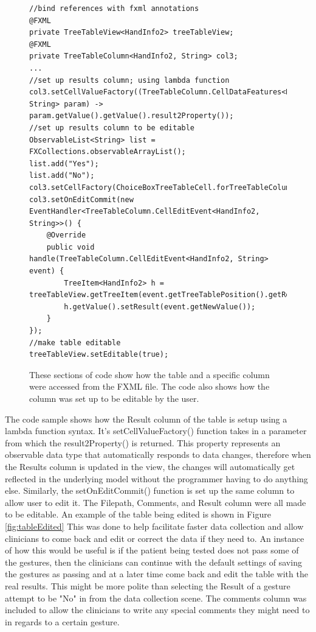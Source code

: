 \begin{figure}[H]
\centering
\begin{lstlisting}
//bind references with fxml annotations
@FXML
private TreeTableView<HandInfo2> treeTableView;
@FXML
private TreeTableColumn<HandInfo2, String> col3;
...
//set up results column; using lambda function
col3.setCellValueFactory((TreeTableColumn.CellDataFeatures<HandInfo2, String> param) -> param.getValue().getValue().result2Property());
//set up results column to be editable
ObservableList<String> list = FXCollections.observableArrayList();
list.add("Yes");
list.add("No");
col3.setCellFactory(ChoiceBoxTreeTableCell.forTreeTableColumn(list));
col3.setOnEditCommit(new EventHandler<TreeTableColumn.CellEditEvent<HandInfo2, String>>() {
	@Override
	public void handle(TreeTableColumn.CellEditEvent<HandInfo2, String> event) {
		TreeItem<HandInfo2> h = treeTableView.getTreeItem(event.getTreeTablePosition().getRow());
		h.getValue().setResult(event.getNewValue());
	}
});
//make table editable
treeTableView.setEditable(true);
\end{lstlisting}
\caption[TreeTableView Editable Results Column]{These sections of code show how the table and a specific column were accessed from the FXML file. The code also shows how the column was set up to be editable by the user.}
\label{fig:tabularDataCode}
\end{figure}
The code sample shows how the Result column of the table is setup using a lambda function syntax. It's setCellValueFactory() function takes in a parameter from which the result2Property() is returned. This property represents an observable data type that automatically responds to data changes, therefore when the Results column is updated in the view, the changes will automatically get reflected in the underlying model without the programmer having to do anything else. Similarly, the setOnEditCommit() function is set up the same column to allow user to edit it. The Filepath, Comments, and Result column were all made to be editable. An example of the table being edited is shown in Figure \ref{fig:tableEdited} This was done to help facilitate faster data collection and allow clinicians to come back and edit or correct the data if they need to. An instance of how this would be useful is if the patient being tested does not pass some of the gestures, then the clinicians can continue with the default settings of saving the gestures as passing and at a later time come back and edit the table with the real results. This might be more polite than selecting the Result of a gesture attempt to be "No" in from the data collection scene. The comments column was included to allow the clinicians to write any special comments they might need to in regards to a certain gesture. 
